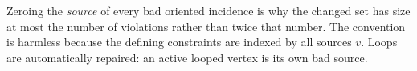 \begin{remark}\label{rem:repair-robust}
Zeroing the \emph{source} of every bad oriented incidence is why the changed
set has size at most the number of violations rather than twice that number.
The convention is harmless because the defining constraints are indexed by
all sources $v$.  Loops are automatically repaired: an active looped vertex
is its own bad source.
\end{remark}
